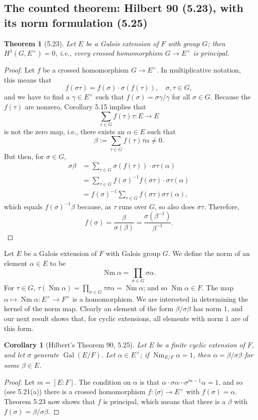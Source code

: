 \documentclass[UTF8,11pt,a4paper]{ctexart}
\newtheorem*{theorem}{Theorem}
\newtheorem*{corollary}{Corollary}
\theoremstyle{definition}\newtheorem*{definition}{Definition}
\theoremstyle{remark}\newtheorem*{remark}{Remark}
\begin{document}
\subsection*{The counted theorem: Hilbert 90 (5.23), with its norm formulation (5.25)}
\begin{theorem}[5.23]
Let $E$ be a Galois extension of $F$ with group $G$; then $H^1(G,E^\times)=0$, i.e., every crossed homomorphism $G\to E^\times$ is principal.
\end{theorem}
\begin{proof}
Let $f$ be a crossed homomorphism $G\to E^\times$. In multiplicative notation, this means that
\[
f(\sigma\tau)=f(\sigma)\cdot\sigma(f(\tau)),\quad\sigma,\tau\in G,
\]
and we have to find a $\gamma\in E^\times$ such that $f(\sigma)=\sigma\gamma/\gamma$ for all $\sigma\in G$. Because the $f(\tau)$ are nonzero, Corollary 5.15 implies that
\[
\sum_{\tau\in G}f(\tau)\tau:E\longrightarrow E
\]
is not the zero map, i.e., there exists an $\alpha\in E$ such that
\[
\beta\mathrel{:=}\sum_{\tau\in G}f(\tau)\tau\alpha\ne0.
\]
But then, for $\sigma\in G$,
\begin{align*}
\sigma\beta
&=\sum_{\tau\in G}\sigma(f(\tau))\cdot\sigma\tau(\alpha)\\
&=\sum_{\tau\in G}f(\sigma)^{-1}f(\sigma\tau)\cdot\sigma\tau(\alpha)\\
&=f(\sigma)^{-1}\sum_{\tau\in G}f(\sigma\tau)\sigma\tau(\alpha),
\end{align*}
which equals $f(\sigma)^{-1}\beta$ because, as $\tau$ runs over $G$, so also does $\sigma\tau$. Therefore,
\[
f(\sigma)=\frac{\beta}{\sigma(\beta)}=\frac{\sigma(\beta^{-1})}{\beta^{-1}}.
\]
\end{proof}
Let $E$ be a Galois extension of $F$ with Galois group $G$. We define the norm of an element $\alpha\in E$ to be
\[
\operatorname{Nm}\alpha=\prod_{\sigma\in G}\sigma\alpha.
\]
For $\tau\in G$, $\tau(\operatorname{Nm}\alpha)=\prod_{\sigma\in G}\tau\sigma\alpha=\operatorname{Nm}\alpha$; and so $\operatorname{Nm}\alpha\in F$. The map $\alpha\mapsto\operatorname{Nm}\alpha:E^\times\to F^\times$ is a homomorphism.
We are interested in determining the kernel of the norm map. Clearly an element of the form $\beta/\sigma\beta$ has norm $1$, and our next result shows that, for cyclic extensions, all elements with norm $1$ are of this form.
\begin{corollary}[Hilbert's Theorem 90, 5.25]
Let $E$ be a finite cyclic extension of $F$, and let $\sigma$ generate $\operatorname{Gal}(E/F)$. Let $\alpha\in E^\times$; if $\operatorname{Nm}_{E/F}\alpha=1$, then $\alpha=\beta/\sigma\beta$ for some $\beta\in E$.
\end{corollary}
\begin{proof}
Let $m=[E:F]$. The condition on $\alpha$ is that $\alpha\cdot\sigma\alpha\cdots\sigma^{m-1}\alpha=1$, and so (see 5.21(a)) there is a crossed homomorphism $f:\langle\sigma\rangle\to E^\times$ with $f(\sigma)=\alpha$. Theorem 5.23 now shows that $f$ is principal, which means that there is a $\beta$ with $f(\sigma)=\beta/\sigma\beta$.
\end{proof}
\end{document}
